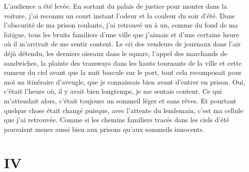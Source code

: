\documentclass[french,twoside]{book} %
\newcommand\chapteropen{} %
\newcommand\chapterclose{} %
\begin{document}
L'audience a été levée. En sortant du palais de justice pour monter dans la voiture, j’ai reconnu un court instant l’odeur et la couleur du soir d’été. Dans l’obscurité de ma prison roulante, j’ai retrouvé un à un, comme du fond de ma fatigue, tous les bruits familiers d’une ville que j’aimais et d’une certaine heure où il m’arrivait de me sentir content. Le cri des vendeurs de journaux dans l’air déjà détendu, les derniers oiseaux dans le square, l’appel des marchands de sandwiches, la plainte des tramways dans les hauts tournants de la ville et cette rumeur du ciel avant que la nuit bascule sur le port, tout cela recomposait pour moi un itinéraire d’aveugle, que je connaissais bien avant d’entrer en prison. Oui, c’était l’heure où, il y avait bien longtemps, je me sentais content. Ce qui m’attendait alors, c’était toujours un sommeil léger et sans rêves. Et pourtant quelque chose était changé puisque, avec l’attente du lendemain, c’est ma cellule que j’ai retrouvée. Comme si les chemins familiers tracés dans les ciels d’été pouvaient mener aussi bien aux prisons qu’aux sommeils innocents.
\chapterclose


\chapteropen
\chapter[{IV}]{IV}
\label{II4}
\end{document}
